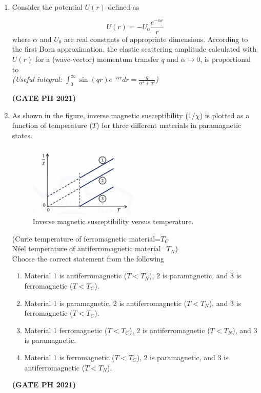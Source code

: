 \documentclass[14pt, a4paper]{extarticle}
\begin{document}
\begin{enumerate}[label=\textbf{Q.\arabic*}]
\begin{enumerate}[label=\textbf{Q.\arabic*}]
\item Consider the potential $U(r)$ defined as

$$ U(r) = -U_0 \frac{e^{-\alpha r}}{r} $$
where $\alpha$ and $U_0$ are real constants of appropriate dimensions. According to the first Born approximation, the elastic scattering amplitude calculated with $U(r)$ for a (wave-vector) momentum transfer $q$ and $\alpha \to 0$, is proportional to \\
\textit{(Useful integral: $\int_0^{\infty} \sin(qr)e^{-\alpha r} dr = \frac{q}{\alpha^2+q^2}$)}
\begin{enumerate}
\end{enumerate}
\hfill \textbf{(GATE PH 2021)}

\item As shown in the figure, inverse magnetic susceptibility ($1/\chi$) is plotted as a function of temperature ($T$) for three different materials in paramagnetic states.
\begin{figure}[H]
\centering
\includegraphics[width=0.5\textwidth]{figs/q51fig21.png}
\caption{Inverse magnetic susceptibility versus temperature.}
\label{fig:q41ph}
\end{figure}
(Curie temperature of ferromagnetic material=$T_C$ \\
Néel temperature of antiferromagnetic material=$T_N$) \\
Choose the correct statement from the following
\begin{enumerate}
\item Material 1 is antiferromagnetic ($T < T_N$), 2 is paramagnetic, and 3 is ferromagnetic ($T < T_C$).
\item Material 1 is paramagnetic, 2 is antiferromagnetic ($T < T_N$), and 3 is ferromagnetic ($T < T_C$).
\item Material 1 ferromagnetic ($T < T_C$), 2 is antiferromagnetic ($T < T_N$), and 3 is paramagnetic.
\item Material 1 is ferromagnetic ($T < T_C$), 2 is paramagnetic, and 3 is antiferromagnetic ($T < T_N$).
\end{enumerate}
\hfill \textbf{(GATE PH 2021)}


\end{enumerate}
\end{enumerate}
\end{document}
